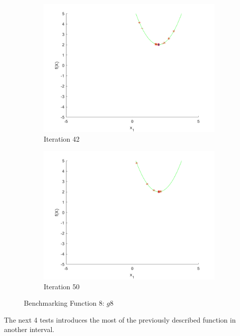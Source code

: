 \begin{figure}
\begin{subfigure}[b]{0.4\textwidth}
   \includegraphics[width=\textwidth]{img/smpl/circshft/loa-iter-42}
   \caption{Iteration 42}
   \label{fig:s8-iter-6}
 \end{subfigure}
 \begin{subfigure}[b]{0.4\textwidth}
   \includegraphics[width=\textwidth]{img/smpl/circshft/loa-iter-50}
   \caption{Iteration 50}
   \label{fig:s8-iter-7}
 \end{subfigure}
 \caption{Benchmarking Function 8: $g8$}
\end{figure}

\clearpage

\par The next 4 tests introduces the most of the previously described function in another interval.

